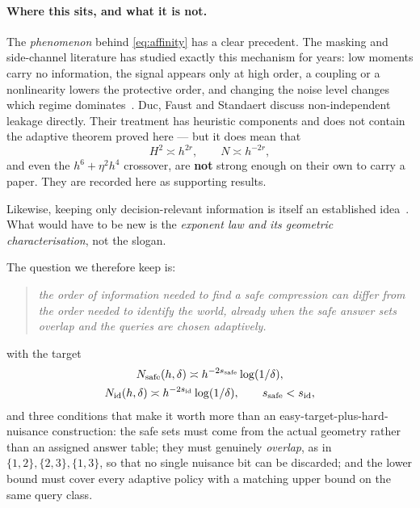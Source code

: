 \paragraph{Where this sits, and what it is not.}
The \emph{phenomenon} behind \eqref{eq:affinity} has a clear precedent. The masking and
side-channel literature has studied exactly this mechanism for years: low moments carry no
information, the signal appears only at high order, a coupling or a nonlinearity lowers
the protective order, and changing the noise level changes which regime
dominates~\cite{duc2015}. Duc, Faust and Standaert discuss non-independent leakage
directly. Their treatment has heuristic components and does not contain the adaptive
theorem proved here --- but it does mean that
\[
H^{2}\asymp h^{2r},\qquad N\asymp h^{-2r},
\]
and even the $h^{6}+\eta^{2}h^{4}$ crossover, are \textbf{not} strong enough on their own
to carry a paper. They are recorded here as supporting results.

Likewise, keeping only decision-relevant information is itself an established
idea~\cite{poli2023}. What would have to be new is the \emph{exponent law and its
geometric characterisation}, not the slogan.

The question we therefore keep is:

\begin{quote}
\emph{the order of information needed to find a safe compression can differ from the order
needed to identify the world, already when the safe answer sets overlap and the queries are
chosen adaptively.}
\end{quote}

with the target
\begin{gather*}
N_{\rm safe}(h,\delta)\asymp h^{-2s_{\rm safe}}\log(1/\delta),\\
N_{\rm id}(h,\delta)\asymp h^{-2s_{\rm id}}\log(1/\delta),
\qquad s_{\rm safe}<s_{\rm id},
\end{gather*}
and three conditions that make it worth more than an easy-target-plus-hard-nuisance
construction: the safe sets must come from the actual  geometry rather
than an assigned answer table; they must genuinely \emph{overlap}, as in
$\{1,2\},\{2,3\},\{1,3\}$, so that no single nuisance bit can be discarded; and the lower
bound must cover every adaptive policy with a matching upper bound on the same query class.



